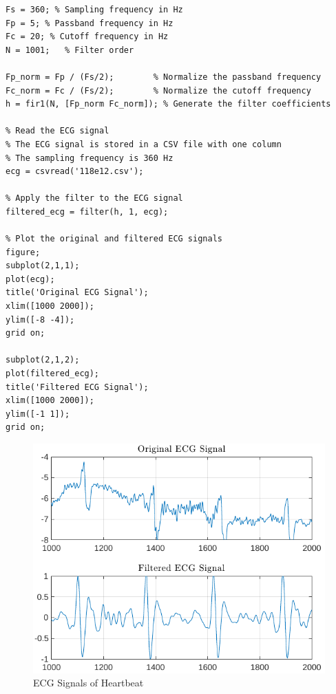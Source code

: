 \documentclass{zc-ust-hw}
\begin{document}
\begin{verbatim}
Fs = 360; % Sampling frequency in Hz
Fp = 5; % Passband frequency in Hz
Fc = 20; % Cutoff frequency in Hz
N = 1001;   % Filter order

Fp_norm = Fp / (Fs/2);        % Normalize the passband frequency
Fc_norm = Fc / (Fs/2);        % Normalize the cutoff frequency
h = fir1(N, [Fp_norm Fc_norm]); % Generate the filter coefficients

% Read the ECG signal
% The ECG signal is stored in a CSV file with one column
% The sampling frequency is 360 Hz
ecg = csvread('118e12.csv');

% Apply the filter to the ECG signal
filtered_ecg = filter(h, 1, ecg);

% Plot the original and filtered ECG signals
figure;
subplot(2,1,1);
plot(ecg);
title('Original ECG Signal');
xlim([1000 2000]);
ylim([-8 -4]);
grid on;

subplot(2,1,2);
plot(filtered_ecg);
title('Filtered ECG Signal');
xlim([1000 2000]);
ylim([-1 1]);
grid on;
\end{verbatim}

\begin{figure}[p]
  \centering
  \includegraphics[width=\textwidth]{figures/ecg-signal.pdf}
  \caption{ECG Signals of Heartbeat}
\end{figure}

\newpage
\printbibliography[heading=bibnumbered]
\end{document}
